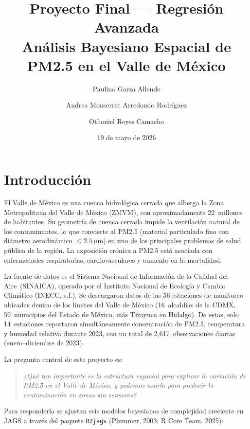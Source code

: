 ﻿\documentclass[12pt]{article}
\title{Proyecto Final --- Regresi\'on Avanzada\\[6pt]
       \large An\'alisis Bayesiano Espacial de PM2.5 en el Valle de M\'exico}
\author{Paulina Garza Allende \and Andrea Monserrat Arredondo Rodr\'iguez \and Othoniel Reyes Camacho}
\date{19 de mayo de 2026}
\begin{document}
\maketitle

\tableofcontents
\bigskip

\section{Introducci\'on}

El Valle de M\'exico es una cuenca hidrol\'ogica cerrada que alberga la
Zona Metropolitana del Valle de M\'exico (ZMVM), con aproximadamente
22~millones de habitantes.
Su geometr\'ia de cuenca cerrada impide la ventilaci\'on natural de los
contaminantes, lo que convierte al PM2.5 (material particulado fino con
di\'ametro aerodin\'amico $\leq 2.5\,\mu$m) en uno de los principales
problemas de salud p\'ublica de la regi\'on.
La exposici\'on cr\'onica a PM2.5 est\'a asociada con enfermedades
respiratorias, cardiovasculares y aumento en la mortalidad.

La fuente de datos es el Sistema Nacional de Informaci\'on de la
Calidad del Aire~(SINAICA), operado por el Instituto Nacional de
Ecolog\'ia y Cambio Clim\'atico (INECC, s.f.).
Se descargaron datos de las 56 estaciones de monitoreo ubicadas dentro
de los l\'imites del Valle de M\'exico (16~alcald\'ias de la CDMX,
59~municipios del Estado de M\'exico, m\'as Tizayuca en Hidalgo).
De estas, solo 14~estaciones reportaron simult\'aneamente concentraci\'on
de PM2.5, temperatura y humedad relativa durante 2023,
con un total de 2{,}617~observaciones diarias (enero--diciembre de 2023).

La pregunta central de este proyecto es:
\begin{quote}
\emph{¿Qu\'e tan importante es la estructura espacial para explicar la variaci\'on
de PM2.5 en el Valle de M\'exico, y podemos usarla para predecir la
contaminaci\'on en zonas sin sensores?}
\end{quote}

Para responderla se ajustan seis modelos bayesianos de complejidad
creciente en JAGS a trav\'es del paquete \texttt{R2jags} (Plummer, 2003; R Core Team, 2025):
\end{document}
